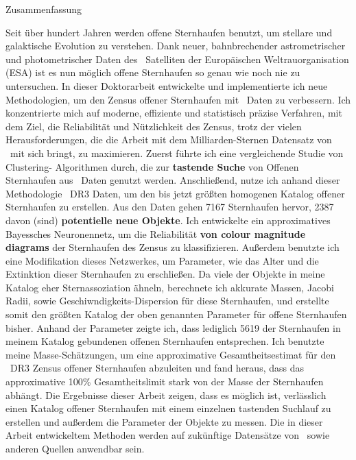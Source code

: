 {Zusammenfassung}
\label{sec:abstract-diff}

Seit über hundert Jahren werden offene Sternhaufen benutzt, um stellare und galaktische Evolution zu verstehen. Dank neuer, bahnbrechender astrometrischer und photometrischer Daten des \gaia\ Satelliten der Europäischen Weltrauorganisation (ESA) ist es nun möglich offene Sternhaufen so genau wie noch nie zu untersuchen. 
In dieser Doktorarbeit entwickelte und implementierte ich neue Methodologien, um den Zensus offener Sternhaufen mit \gaia\ Daten zu verbessern. Ich konzentrierte mich auf moderne, effiziente und statistisch präzise Verfahren, mit dem Ziel, die Reliabilität und Nützlichkeit des Zensus, trotz der vielen Herausforderungen, die die Arbeit mit dem Milliarden-Sternen Datensatz von \gaia\ mit sich bringt, zu maximieren. 
Zuerst führte ich eine vergleichende Studie von Clustering- Algorithmen durch, die zur \textbf{tastende Suche} von Offenen Sternhaufen aus \gaia\ Daten genutzt werden. Anschließend, nutze ich anhand dieser Methodologie \gaia\ DR3 Daten, um den bis jetzt größten homogenen Katalog offener Sternhaufen zu erstellen. Aus den Daten gehen 7167 Sternhaufen hervor, 2387 davon (sind) \textbf{potentielle neue Objekte}. Ich entwickelte ein approximatives Bayessches Neuronennetz, um die Reliabilität \textbf{von colour magnitude diagrams} der Sternhaufen des Zensus zu klassifizieren. Außerdem benutzte ich eine Modifikation dieses Netzwerkes, um Parameter, wie das Alter und die Extinktion dieser Sternhaufen zu erschließen.
Da viele der Objekte in meine Katalog eher Sternassoziation ähneln, berechnete ich akkurate Massen, Jacobi Radii, sowie Geschiwndigkeits-Dispersion für diese Sternhaufen, und erstellte somit den größten Katalog der oben genannten Parameter für offene Sternhaufen bisher. 
Anhand der Parameter zeigte ich, dass lediglich 5619 der Sternhaufen in meinem Katalog gebundenen offenen Sternhaufen entsprechen. 
Ich benutzte meine Masse-Schätzungen, um eine approximative Gesamtheitsestimat für den \gaia\ DR3 Zensus offener Sternhaufen abzuleiten und fand heraus, dass das approximative 100\% Gesamtheitslimit stark von der Masse der Sternhaufen abhängt. 
Die Ergebnisse dieser Arbeit zeigen, dass es möglich ist, verlässlich einen Katalog offener Sternhaufen mit einem einzelnen tastenden Suchlauf zu erstellen und außerdem die Parameter der Objekte zu messen. 
Die in dieser Arbeit entwickeltem Methoden werden auf zukünftige Datensätze von \gaia\ sowie anderen Quellen anwendbar sein. 
